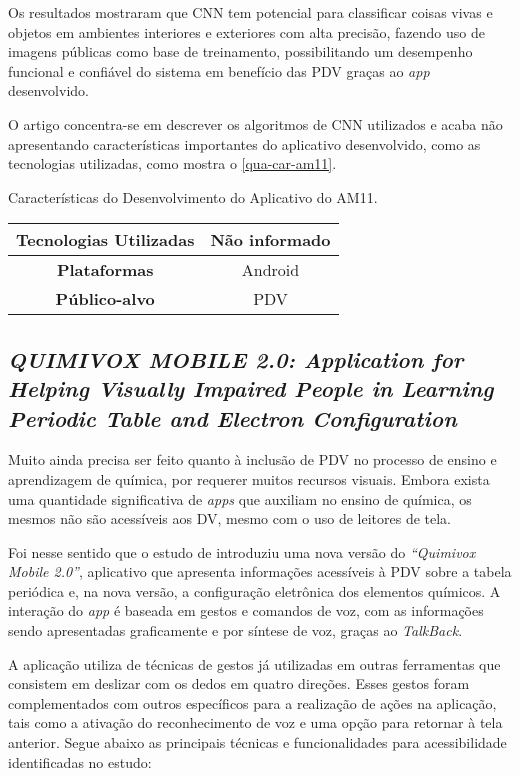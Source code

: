 Os resultados mostraram que CNN tem potencial para classificar coisas vivas e objetos em ambientes interiores e exteriores com alta precisão, fazendo uso de imagens públicas
como base de treinamento, possibilitando um desempenho funcional e confiável do sistema em benefício das PDV graças ao \emph{app} desenvolvido.

O artigo concentra-se em descrever os algoritmos de CNN utilizados e acaba não apresentando características importantes
do aplicativo desenvolvido, como as tecnologias utilizadas, como mostra o \autoref{qua-car-am11}.

\begin{quadro}[htb!]
  \caption{\label{qua-car-am11}Características do Desenvolvimento do Aplicativo do AM11.}
  \begin{tabular}{|c|c|}
    \hline
    \textbf{Tecnologias Utilizadas} & Não informado \\ \hline
    \textbf{Plataformas}            & Android       \\ \hline
    \textbf{Público-alvo}           & PDV           \\
    \hline
  \end{tabular}
\end{quadro}

\subsection{\emph{QUIMIVOX MOBILE 2.0: Application for Helping Visually Impaired People in Learning Periodic Table and Electron Configuration}}

Muito ainda precisa ser feito quanto à inclusão de PDV no processo de ensino e aprendizagem de química, por requerer muitos recursos visuais.
Embora exista uma quantidade significativa de \emph{apps} que auxiliam no ensino de química, os mesmos não são acessíveis aos DV, mesmo com o uso de leitores de tela.

Foi nesse sentido que o estudo de  introduziu uma nova versão do \emph{``Quimivox Mobile 2.0''},
aplicativo que apresenta informações acessíveis à PDV sobre a tabela periódica e, na nova versão, a configuração eletrônica
dos elementos químicos. A interação do \emph{app} é baseada em gestos e comandos de voz, com as informações sendo apresentadas
graficamente e por síntese de voz, graças ao \emph{TalkBack}.

A aplicação utiliza de técnicas de gestos já utilizadas em outras ferramentas que consistem em deslizar com os dedos em quatro
direções. Esses gestos foram complementados com outros específicos para a realização de ações na aplicação, tais como a ativação
do reconhecimento de voz e uma opção para retornar à tela anterior.
Segue abaixo as principais técnicas e funcionalidades para acessibilidade identificadas no estudo:

